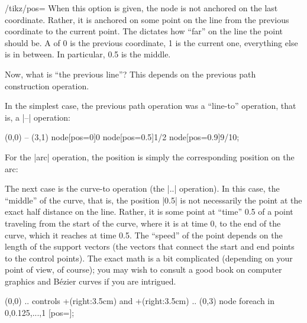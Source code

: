     \label{section-pos-option}

\begin{key}{/tikz/pos=}
    When this option is given, the node is not anchored on the last coordinate.
    Rather, it is anchored on some point on the line from the previous
    coordinate to the current point. The  dictates how ``far''
    on the line the point should be. A  of 0 is the previous
    coordinate, 1 is the current one, everything else is in between. In
    particular, 0.5 is the middle.

    Now, what is ``the previous line''? This depends on the previous path
    construction operation.

    In the simplest case, the previous path operation was a ``line-to''
    operation, that is, a |--| operation:
\begin{codeexample}[]
\tikz \draw (0,0) -- (3,1)
    node[pos=0]{0} node[pos=0.5]{1/2} node[pos=0.9]{9/10};
\end{codeexample}

    For the |arc| operation, the position is simply the corresponding position
    on the arc:
\begin{codeexample}[]
\end{codeexample}

    The next case is the curve-to operation (the |..| operation). In this case,
    the ``middle'' of the curve, that is, the position |0.5| is not necessarily
    the point at the exact half distance on the line. Rather, it is some point
    at ``time'' 0.5 of a point traveling from the start of the curve, where it
    is at time 0, to the end of the curve, which it reaches at time 0.5. The
    ``speed'' of the point depends on the length of the support vectors (the
    vectors that connect the start and end points to the control points). The
    exact math is a bit complicated (depending on your point of view, of
    course); you may wish to consult a good book on computer graphics and
    Bézier curves if you are intrigued.
\begin{codeexample}[]
\tikz \draw (0,0) .. controls +(right:3.5cm) and +(right:3.5cm) .. (0,3)
  node foreach \p in {0,0.125,...,1} [pos=\p]{\p};
\end{codeexample}


\end{key}
